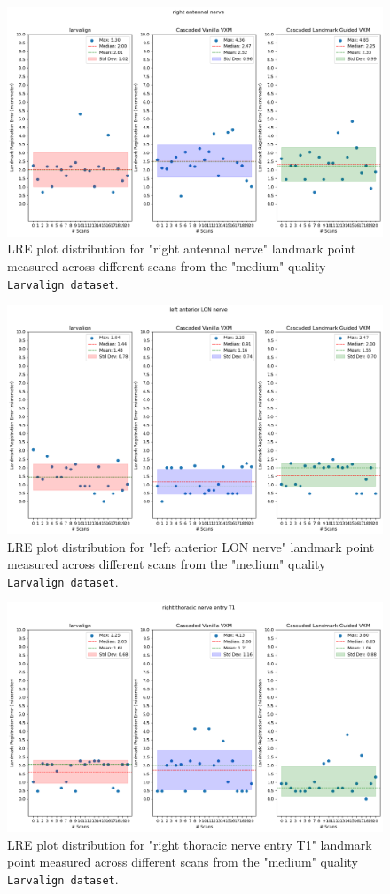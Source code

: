 \documentclass{book}
\begin{document}
	\begin{figure}[h!]
		\centering
		\includegraphics[width=0.75\columnwidth]{resources/chapter5_fresh/output/right antennal nerve.png}
		\caption{LRE plot distribution for "right antennal nerve" landmark point measured across different scans from the "medium" quality \texttt{Larvalign dataset}.}
		\label{fig:landmark9}
	\end{figure}
	
	\begin{figure}[h!]
		\centering
		\includegraphics[width=0.75\columnwidth]{resources/chapter5_fresh/output/left anterior LON nerve.png}
		\caption{LRE plot distribution for "left anterior LON nerve" landmark point measured across different scans from the "medium" quality \texttt{Larvalign dataset}.}
		\label{fig:landmark10}
	\end{figure}
	
	\begin{figure}[h!]
		\centering
		\includegraphics[width=0.75\columnwidth]{resources/chapter5_fresh/output/right thoracic nerve entry T1.png}
		\caption{LRE plot distribution for "right thoracic nerve entry T1" landmark point measured across different scans from the "medium" quality \texttt{Larvalign dataset}.}
		\label{fig:landmark11}
	\end{figure}
	
\end{document}
